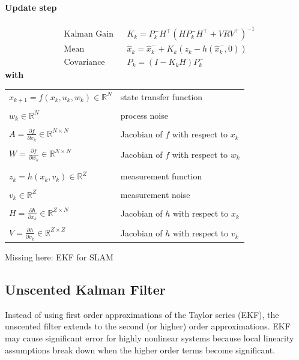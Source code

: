 \begin{multicols*}{2}
\paragraph{Update step}
\begin{align*}
	&\text{Kalman Gain} && K_k = P_k^- H^\top (H P_k^- H^\top + V R V^\top)^{-1} \\
	&\text{Mean} && \hat{x}_k = \hat{x}_k^- + K_k (z_k - h(\hat{x}_k^-, 0)) \\
	&\text{Covariance }  && P_k = (I - K_k H) P_k^-
\end{align*}
\textbf{with}\\
\vspace{5mm}
\begin{tabular}{ll}
	\\[-1em]
	$x_{k+1} = f(x_k, u_k, w_k) \in \mathbb{R}^{N}$ & state transfer function \\
	\\[-1em]
	$w_k \in \mathbb{R}^N$ & process noise \\
	\\[-1em]
	$A = \frac{\partial f}{\partial x_k} \in \mathbb{R}^{N \times N}$ & Jacobian of $f$ with respect to $x_k$ \\
	\\[-1em]
	$W = \frac{\partial f}{\partial w_k} \in \mathbb{R}^{N \times N}$ & Jacobian of $f$ with respect to $w_k$ \\
	\\[-0.3em]
	\hline
	\\[-0.3em]
	$z_k = h(x_k, v_k) \in \mathbb{R}^{Z}$ & measurement function \\
	\\[-1em]
	$v_k  \in \mathbb{R}^{Z}$ & measurement noise \\
	\\[-1em]
	$H = \frac{\partial h}{\partial x_k} \in \mathbb{R}^{Z \times N}$ & Jacobian of $h$ with respect to $x_k$ \\
	\\[-1em]
	$V = \frac{\partial h}{\partial v_k} \in \mathbb{R}^{Z \times Z}$ & Jacobian of $h$ with respect to $v_k$
\end{tabular}

Missing here: EKF for SLAM

\subsection{Unscented Kalman Filter}
Instead of using first order approximations of the Taylor series (EKF), the unscented filter extends to the second (or higher) order approximations.
EKF may cause significant error for highly nonlinear systems because local linearity assumptions break down when the higher order terms become significant.


\end{multicols*}
